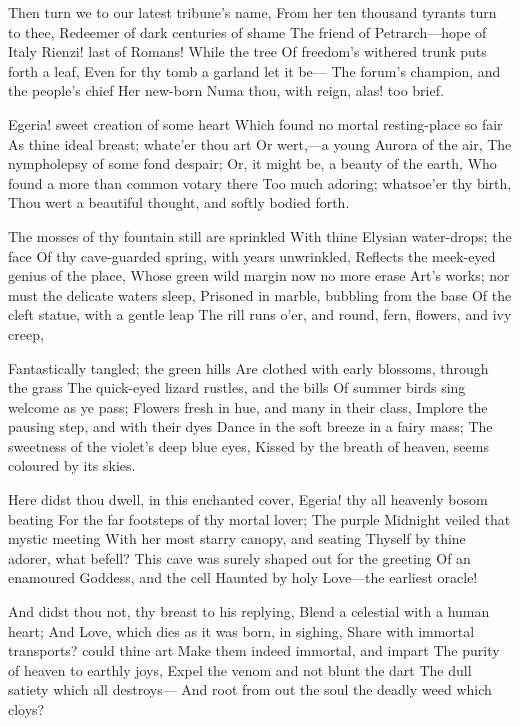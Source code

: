 \documentclass[10pt,twocolumn]{book}
\begin{document}
   Then turn we to our latest tribune's name,
   From her ten thousand tyrants turn to thee,
   Redeemer of dark centuries of shame\textemdash
   The friend of Petrarch---hope of Italy\textemdash
   Rienzi! last of Romans!  While the tree
   Of freedom's withered trunk puts forth a leaf,
   Even for thy tomb a garland let it be---
   The forum's champion, and the people's chief\textemdash
Her new-born Numa thou, with reign, alas! too brief.


   Egeria! sweet creation of some heart
   Which found no mortal resting-place so fair
   As thine ideal breast; whate'er thou art
   Or wert,---a young Aurora of the air,
   The nympholepsy of some fond despair;
   Or, it might be, a beauty of the earth,
   Who found a more than common votary there
   Too much adoring; whatsoe'er thy birth,
Thou wert a beautiful thought, and softly bodied forth.


   The mosses of thy fountain still are sprinkled
   With thine Elysian water-drops; the face
   Of thy cave-guarded spring, with years unwrinkled,
   Reflects the meek-eyed genius of the place,
   Whose green wild margin now no more erase
   Art's works; nor must the delicate waters sleep,
   Prisoned in marble, bubbling from the base
   Of the cleft statue, with a gentle leap
The rill runs o'er, and round, fern, flowers, and ivy creep,


   Fantastically tangled; the green hills
   Are clothed with early blossoms, through the grass
   The quick-eyed lizard rustles, and the bills
   Of summer birds sing welcome as ye pass;
   Flowers fresh in hue, and many in their class,
   Implore the pausing step, and with their dyes
   Dance in the soft breeze in a fairy mass;
   The sweetness of the violet's deep blue eyes,
Kissed by the breath of heaven, seems coloured by its skies.


   Here didst thou dwell, in this enchanted cover,
   Egeria! thy all heavenly bosom beating
   For the far footsteps of thy mortal lover;
   The purple Midnight veiled that mystic meeting
   With her most starry canopy, and seating
   Thyself by thine adorer, what befell?
   This cave was surely shaped out for the greeting
   Of an enamoured Goddess, and the cell
Haunted by holy Love---the earliest oracle!


   And didst thou not, thy breast to his replying,
   Blend a celestial with a human heart;
   And Love, which dies as it was born, in sighing,
   Share with immortal transports? could thine art
   Make them indeed immortal, and impart
   The purity of heaven to earthly joys,
   Expel the venom and not blunt the dart\textemdash
   The dull satiety which all destroys---
And root from out the soul the deadly weed which cloys?
\end{document}
